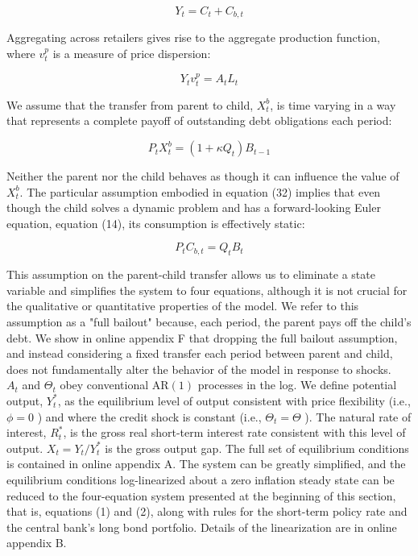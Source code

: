 \documentclass[10pt]{article}
\begin{document}
\begin{equation*}
Y_{t}=C_{t}+C_{b, t} \tag{30}
\end{equation*}

Aggregating across retailers gives rise to the aggregate production function, where $v_{t}^{p}$ is a measure of price dispersion:

\begin{equation*}
Y_{t} v_{t}^{p}=A_{t} L_{t} \tag{31}
\end{equation*}

We assume that the transfer from parent to child, $X_{t}^{b}$, is time varying in a way that represents a complete payoff of outstanding debt obligations each period:

\begin{equation*}
P_{t} X_{t}^{b}=\left(1+\kappa Q_{t}\right) B_{t-1} \tag{32}
\end{equation*}

Neither the parent nor the child behaves as though it can influence the value of $X_{t}^{b}$. The particular assumption embodied in equation (32) implies that even though the child solves a dynamic problem and has a forward-looking Euler equation, equation (14), its consumption is effectively static:

\begin{equation*}
P_{t} C_{b, t}=Q_{t} B_{t} \tag{33}
\end{equation*}

This assumption on the parent-child transfer allows us to eliminate a state variable and simplifies the system to four equations, although it is not crucial for the qualitative or quantitative properties of the model. We refer to this assumption as a "full bailout" because, each period, the parent pays off the child's debt. We show in online appendix F that dropping the full bailout assumption, and instead considering a fixed transfer each period between parent and child, does not fundamentally alter the behavior of the model in response to shocks.\\
$A_{t}$ and $\Theta_{t}$ obey conventional $\mathrm{AR}(1)$ processes in the log. We define potential output, $Y_{t}^{*}$, as the equilibrium level of output consistent with price flexibility (i.e., $\phi=0$ ) and where the credit shock is constant (i.e., $\Theta_{t}=\Theta$ ). The natural rate of interest, $R_{t}^{*}$, is the gross real short-term interest rate consistent with this level of output. $X_{t}=Y_{t} / Y_{t}^{*}$ is the gross output gap. The full set of equilibrium conditions is contained in online appendix A. The system can be greatly simplified, and the equilibrium conditions log-linearized about a zero inflation steady state can be reduced to the four-equation system presented at the beginning of this section, that is, equations (1) and (2), along with rules for the short-term policy rate and the central bank's long bond portfolio. Details of the linearization are in online appendix B.
\end{document}
